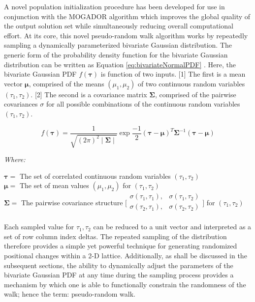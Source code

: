 A novel population initialization procedure has been developed for use in conjunction with the MOGADOR algorithm which improves the global quality of the output solution set while simultaneously reducing overall computational effort. At its core, this novel pseudo-random walk algorithm works by repeatedly sampling a dynamically parameterized bivariate Gaussian distribution. The generic form of the probability density function for the bivariate Gaussian distribution can be written as Equation \ref{eq:bivariateNormalPDF} \cite{Johnson2002}. Here, the bivariate Gaussian PDF $f(\boldsymbol{\tau})$ is function of two inputs. [1] The first is a mean vector $\boldsymbol{\mu}$, comprised of the means $(\mu_1, \mu_2)$ of two continuous random variables $(\tau_1, \tau_2)$. [2] The second is a covariance matrix $\boldsymbol{\Sigma}$, comprised of the pairwise covariances $\sigma$ for all possible combinations of the continuous random variables $(\tau_1, \tau_2)$.
            
            \begin{equation}
            f(\boldsymbol{\tau}) = \frac{1}{ \sqrt{ (2\pi)^2 \mid \boldsymbol{\Sigma} \mid} } \exp{ \frac{-1}{2} ( \boldsymbol{\tau} - \boldsymbol{\mu} )^T \boldsymbol{ \Sigma}^{-1} ( \boldsymbol{\tau} - \boldsymbol{\mu} ) }
            \label{eq:bivariateNormalPDF}
            \end{equation}

            \noindent \textit{Where:} \hfill

            \begin{center}
            $\boldsymbol{\tau} =$ The set of correlated continuous random variables $(\tau_1, \tau_2)$
            \\
            $\boldsymbol{\mu} = $ The set of mean values $(\mu_1, \mu_2)$ for $(\tau_1, \tau_2)$
            \\
            $\boldsymbol{\Sigma} =$ The pairwise covariance structure $\Biggl[\begin{matrix} \sigma(\tau_1,\tau_1), & \sigma(\tau_1,\tau_2) \\ \sigma(\tau_2,\tau_1), & \sigma(\tau_2,\tau_2) \\ \end{matrix}\Biggr]$ for $(\tau_{1}, \tau_{2})$
            \end{center}
            
Each sampled value for $\tau_1, \tau_2$ can be reduced to a unit vector and interpreted as a set of row column index deltas. The repeated sampling of the distribution therefore provides a simple yet powerful technique for generating randomized positional changes within a 2-D lattice. Additionally, as shall be discussed in the subsequent sections, the ability to dynamically adjust the parameters of the bivariate Gaussian PDF at any time during the sampling process provides a mechanism by which one is able to functionally constrain the randomness of the walk; hence the term: pseudo-random walk.
            
